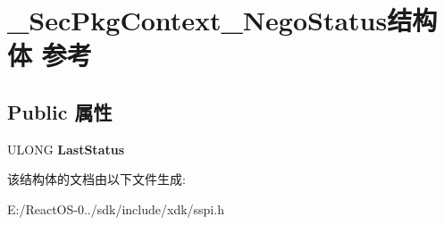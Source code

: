 \hypertarget{struct___sec_pkg_context___nego_status}{}\section{\+\_\+\+Sec\+Pkg\+Context\+\_\+\+Nego\+Status结构体 参考}
\label{struct___sec_pkg_context___nego_status}
\subsection*{Public 属性}
\begin{DoxyCompactItemize}
\item 
\mbox{\label{struct___sec_pkg_context___nego_status_a3564b0e346ab4a3b6970140ec0127e0b}} 
U\+L\+O\+NG {\bfseries Last\+Status}
\end{DoxyCompactItemize}


该结构体的文档由以下文件生成\+:\begin{DoxyCompactItemize}
\item 
E\+:/\+React\+O\+S-\/0../sdk/include/xdk/sspi.\+h\end{DoxyCompactItemize}
